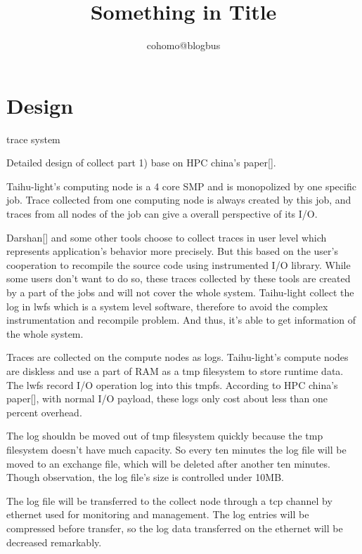\documentclass{article}
\begin{document}
\title{Something in Title}

\author{cohomo@blogbus}

\date{}

\maketitle

\fi

\section{Design}

\label{sec:design}

trace system

Detailed design of collect part 1)
base on HPC china's paper[].

Taihu-light's computing node is a 4 core SMP and is monopolized by one specific job. Trace collected from one computing node is always created by this job, and traces from all nodes of the job can give a overall perspective of its I/O.

Darshan[] and some other tools choose to collect traces in user level which represents application's behavior more precisely. But this based on the user's cooperation to recompile the source code using instrumented I/O library. While some users don't want to do so, these traces collected by these tools are created by a part of the jobs and will not cover the whole system. Taihu-light collect the log in lwfs which is a system level software, therefore to avoid the complex instrumentation and recompile problem. And thus, it's able to get information of the whole system.

Traces are collected on the compute nodes as logs. Taihu-light's compute nodes are diskless and use a part of RAM as a tmp filesystem to store runtime data. The lwfs record I/O operation log into this tmpfs. According to HPC china's paper[], with normal I/O payload, these logs only cost about less than one percent overhead.

The log shouldn be moved out of tmp filesystem quickly because the tmp filesystem doesn't have much capacity. So every ten minutes the log file will be moved to an exchange file, which will be deleted after another ten minutes. Though observation, the log file's size is controlled under 10MB.

The log file will be transferred to the collect node through a tcp channel by ethernet used for monitoring and management. The log entries will be compressed before transfer, so the log data transferred on the ethernet will be decreased remarkably.
\end{document}

